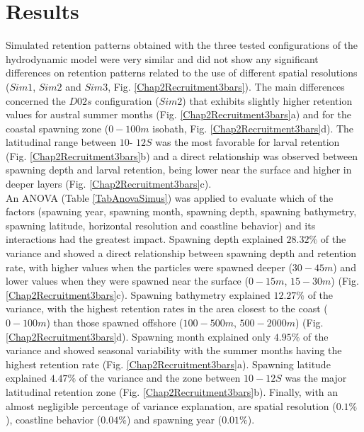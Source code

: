 \clearpage
\section{Results}\label{Chap2Resu}

Simulated retention patterns obtained with the three tested configurations of the hydrodynamic model were very similar and did not show any significant differences on retention patterns related to the use of different spatial resolutions ($Sim 1$, $Sim 2$ and $Sim 3$, Fig. \ref{Chap2Recruitment3bars}). The main differences concerned the $D02s$ configuration ($Sim 2$) that exhibits slightly higher retention values for austral summer months (Fig. \ref{Chap2Recruitment3bars}a) and for the coastal spawning zone ($0-100m$ isobath, Fig. \ref{Chap2Recruitment3bars}d). The latitudinal range between $10$\textdegree - $12$\textdegree $S$ was the most favorable for larval retention (Fig. \ref{Chap2Recruitment3bars}b) and a direct relationship was observed between spawning depth and larval retention, being lower near the surface and higher in deeper layers (Fig. \ref{Chap2Recruitment3bars}c).\\

An ANOVA (Table \ref{TabAnovaSimus}) was applied to evaluate which of the factors (spawning year, spawning month, spawning depth, spawning bathymetry, spawning latitude, horizontal resolution and coastline behavior) and its interactions had the greatest impact. Spawning  depth explained $28.32 \%$ of the variance and showed a direct relationship between spawning depth and retention rate, with higher values when the particles were spawned deeper ($30 - 45 m$) and lower values when they were spawned near the surface ($0 - 15 m$, $15 - 30 m$) (Fig. \ref{Chap2Recruitment3bars}c). Spawning bathymetry explained $12.27 \%$ of the variance, with the highest retention rates in the area closest to the coast ($0 - 100 m$) than those spawned offshore ($100 - 500 m$, $500 - 2000 m$) (Fig. \ref{Chap2Recruitment3bars}d). Spawning month explained only $4.95 \%$ of the variance and showed seasonal variability with the summer months having the highest retention rate (Fig. \ref{Chap2Recruitment3bars}a). Spawning latitude explained $4.47 \%$ of the variance and the zone between $10 - 12$\textdegree $S$ was the major latitudinal retention zone (Fig. \ref{Chap2Recruitment3bars}b). Finally, with an almost negligible percentage of variance explanation, are spatial resolution ($0.1 \%$), coastline behavior ($0.04 \%$) and spawning year ($0.01 \%$).\\

